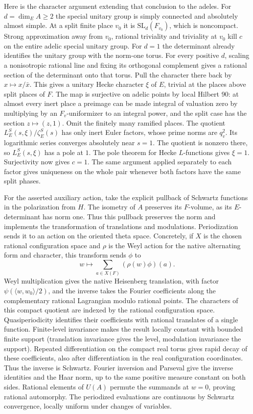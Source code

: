 Here is the character argument extending that conclusion to the
adeles. For $d=\dim_E A\ge2$ the special unitary group is simply
connected and absolutely almost simple. At a split finite place
$v_0$ it is $\mathrm{SL}_d(F_{v_0})$, which is noncompact. Strong
approximation away from $v_0$, rational triviality and triviality
at $v_0$ kill $c$ on the entire adelic special unitary group.
For $d=1$ the determinant already identifies the unitary group
with the norm-one torus. For every positive $d$, scaling a
nonisotropic rational line and fixing its orthogonal complement
gives a rational section of the determinant onto that torus.
Pull the character there back by $x\mapsto x/\bar x$. This gives
a unitary Hecke character $\xi$ of $E$, trivial at the places
above split places of $F$. The map is surjective on adelic
points by local Hilbert 90: at almost every inert place a preimage
can be made integral of valuation zero by multiplying by an
$F_v$-uniformizer to an integral power, and the split case has
the section $z\mapsto(z,1)$. Omit the finitely many ramified
places. The quotient $L_E^S(s,\xi)/\zeta_E^S(s)$ has only inert
Euler factors, whose prime norms are $q_v^2$. Its logarithmic
series converges absolutely near $s=1$. The quotient is nonzero
there, so $L_E^S(s,\xi)$ has a pole at $1$. The pole theorem for
Hecke $L$-functions gives $\xi=1$. Surjectivity now gives $c=1$.
The same argument applied separately to each factor gives uniqueness
on the whole pair whenever both factors have the same split phases.

For the asserted auxiliary action, take the explicit pullback of
Schwartz functions in the polarization from $H$. The isometry of
$A$ preserves its $F$-volume, as its $E$-determinant has norm one.
Thus this pullback preserves the norm and implements the
transformation of translations and modulations. Periodization sends
it to an action on the oriented theta space. Concretely, if $X$ is
the chosen rational configuration space and $\rho$ is the Weyl
action for the native alternating form and character, this transform
sends $\phi$ to
\[
                  w\longmapsto\sum_{a\in X(F)}(\rho(w)\phi)(a).
\]
Weyl multiplication gives the native Heisenberg translation, with
factor $\psi(\langle w,w_0\rangle/2)$, and the inverse takes the
Fourier coefficients along the complementary rational Lagrangian
modulo rational points. The characters of this compact quotient
are indexed by the rational configuration space. Quasiperiodicity
identifies their coefficients with rational translates of a single
function. Finite-level invariance makes the result locally constant
with bounded finite support (translation invariance gives the level,
modulation invariance the support). Repeated differentiation on the
compact real torus gives rapid decay of these coefficients, also
after differentiation in the real configuration coordinates. Thus
the inverse is Schwartz. Fourier inversion and Parseval give the
inverse identities and the Haar norm, up to the same positive
measure constant on both sides. Rational elements of $U(A)$
permute the summands at $w=0$, proving rational automorphy.
The periodized evaluations are continuous by Schwartz convergence,
locally uniform under changes of variables.

